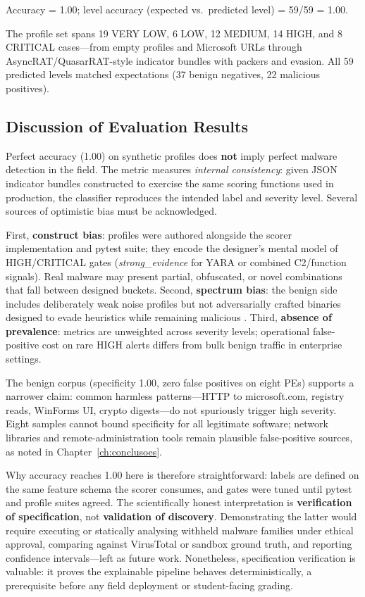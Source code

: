 \noindent\small
Accuracy = 1.00; level accuracy (expected vs.\ predicted level) = 59/59 = 1.00.

The profile set spans 19 VERY LOW, 6 LOW, 12 MEDIUM, 14 HIGH, and 8 CRITICAL cases---from empty
profiles and Microsoft URLs through AsyncRAT/QuasarRAT-style indicator bundles with packers and
evasion. All 59 predicted levels matched expectations (37 benign negatives, 22 malicious positives).

\subsection{Discussion of Evaluation Results}
\label{sec:discussion-results}

Perfect accuracy (1.00) on synthetic profiles does \textbf{not} imply perfect malware detection in
the field. The metric measures \emph{internal consistency}: given JSON indicator bundles constructed
to exercise the same scoring functions used in production, the classifier reproduces the intended
label and severity level. Several sources of optimistic bias must be acknowledged.

First, \textbf{construct bias}: profiles were authored alongside the scorer implementation and
pytest suite; they encode the designer's mental model of HIGH/CRITICAL gates (\emph{strong\_evidence}
for YARA or combined C2/function signals). Real malware may present partial, obfuscated, or novel
combinations that fall between designed buckets. Second, \textbf{spectrum bias}: the benign side
includes deliberately weak noise profiles but not adversarially crafted binaries designed to evade
heuristics while remaining malicious \cite{imran2024}. Third, \textbf{absence of prevalence}: metrics are unweighted
across severity levels; operational false-positive cost on rare HIGH alerts differs from bulk
benign traffic in enterprise settings.

The benign corpus (specificity 1.00, zero false positives on eight PEs) supports a narrower claim:
common harmless patterns---HTTP to microsoft.com, registry reads, WinForms UI, crypto digests---do
not spuriously trigger high severity. Eight samples cannot bound specificity for all legitimate
software; network libraries and remote-administration tools remain plausible false-positive sources,
as noted in Chapter~\ref{ch:conclusoes}.

Why accuracy reaches 1.00 here is therefore straightforward: labels are defined on the same feature
schema the scorer consumes, and gates were tuned until pytest and profile suites agreed. The
scientifically honest interpretation is \textbf{verification of specification}, not \textbf{validation
of discovery}. Demonstrating the latter would require executing or statically analysing withheld
malware families under ethical approval, comparing against VirusTotal or sandbox ground truth, and
reporting confidence intervals---left as future work. Nonetheless, specification verification is
valuable: it proves the explainable pipeline behaves deterministically, a prerequisite before any
field deployment or student-facing grading.

